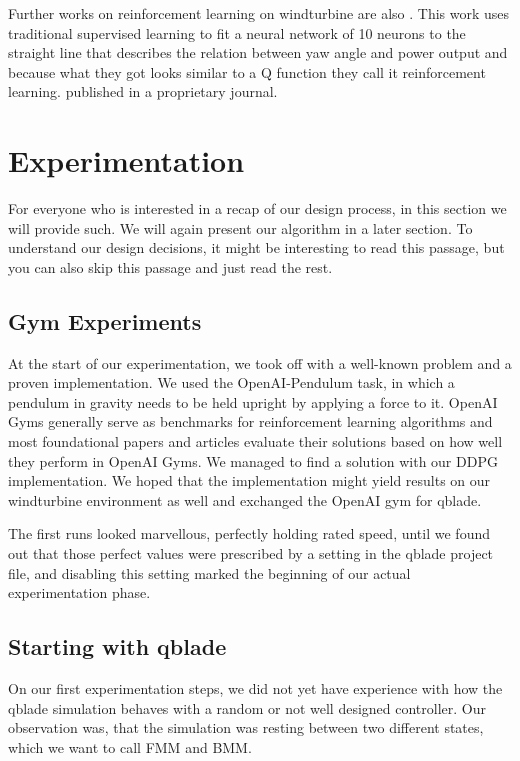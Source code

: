 \documentclass[hyperref,beleg]{cgvpub}
\begin{document}
Further works on reinforcement learning on windturbine are also \cite{saenz-aguirreArtificialNeuralNetwork2019}. This work uses traditional supervised learning to fit a neural network of 10 neurons to the straight line that describes the relation between yaw angle and power output and because what they got looks similar to a Q function they call it reinforcement learning. \cite{fernandez-gaunaVariableSpeedWind2016} published in a proprietary journal. 


\chapter{Experimentation}

For everyone who is interested in a recap of our design process, in this section we will provide such. We will again present our algorithm in a later section. To understand our design decisions, it might be interesting to read this passage, but you can also skip this passage and just read the rest. 

\section{Gym Experiments}
\label{sec:gymexperiments}
At the start of our experimentation, we took off with a well-known problem and a proven implementation. We used the OpenAI-Pendulum task, in which a pendulum in gravity needs to be held upright by applying a force to it. OpenAI Gyms generally serve as benchmarks for reinforcement learning algorithms and most foundational papers and articles evaluate their solutions based on how well they perform in OpenAI Gyms. We managed to find a solution with our DDPG implementation. We hoped that the implementation might yield results on our windturbine environment as well and exchanged the OpenAI gym for qblade.

The first runs looked marvellous, perfectly holding rated speed, until we found out that those perfect values were prescribed by a setting in the qblade project file, and disabling this setting marked the beginning of our actual experimentation phase.

\section{Starting with qblade}

On our first experimentation steps, we did not yet have experience with how the qblade simulation behaves with a random or not well designed controller. Our observation was, that the simulation was resting between two different states, which we want to call \ac{FMM} and \ac{BMM}.
\end{document}

